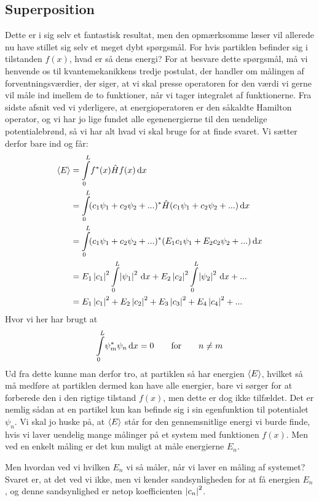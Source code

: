 \documentclass[../Kvantemekanik.tex]{subfiles}
\begin{document}
\subsection{Superposition}
Dette er i sig selv et fantastisk resultat, men den opmærksomme læser vil allerede nu have stillet sig selv et meget dybt spørgsmål. For hvis partiklen befinder sig i tilstanden $f(x)$, hvad er så dens energi? For at besvare dette spørgsmål, må vi henvende os til kvantemekanikkens tredje postulat, der handler om målingen af forventningsværdier, der siger, at vi skal presse operatoren for den værdi vi gerne vil måle ind imellem de to funktioner, når vi tager integralet af funktionerne. Fra sidste afsnit ved vi yderligere, at energioperatoren er den såkaldte Hamilton operator, og vi har jo lige fundet alle egenenergierne til den uendelige potentialebrønd, så vi har alt hvad vi skal bruge for at finde svaret. Vi sætter derfor bare ind og får:
\begin{align}
    \expect E&=\integral{f^*(x)\op H f(x)}{x}{0}{L}\nonumber\\
    &=\integral{(c_1\psi_1+c_2\psi_2+...)^{*}\hat{H}(c_1\psi_1+c_2\psi_2+...)}{x}{0}{L}\nonumber\\
    &=\integral{(c_1\psi_1+c_2\psi_2+...)^{*}(E_1c_1\psi_1+E_2c_2\psi_2+...)}{x}{0}{L}\nonumber\\
    &=E_1\abs{c_1}^2\integral{\abs{\psi_1}^2}{x}{0}{L}+E_2\abs{c_2}^2\integral{\abs{\psi_2}^2}{x}{0}{L}+...\nonumber\\
    &=E_1\abs{c_1}^2+E_2\abs{c_2}^2+E_3\abs{c_3}^2+E_4\abs{c_4}^2+...\label{eq:kvant:frovE}
\end{align}
Hvor vi her har brugt at 
$$ \integral{\psi_{m}^{*}\psi_n}{x}{0}{L}=0 \qquad \text{for} \qquad n \neq m$$
Ud fra dette kunne man derfor tro, at partiklen så har energien $\expect E$, hvilket så må medføre at partiklen dermed kan have alle energier, bare vi sørger for at forberede den i den rigtige tilstand $f(x)$, men dette er dog ikke tilfældet.
Det er nemlig sådan at en partikel kun kan befinde sig i sin egenfunktion til potentialet $\psi_n$. Vi skal jo huske på, at $\expect E$ står for den gennemsnitlige energi vi burde finde, hvis vi laver uendelig mange målinger på et system med funktionen $f(x)$. Men ved en enkelt måling er det kun muligt at måle energierne $E_n$.

Men hvordan ved vi hvilken $E_n$ vi så måler, når vi laver en måling af systemet? Svaret er, at det ved vi ikke, men vi kender sandsynligheden for at få energien $E_n$, og denne sandsynlighed er netop koefficienten $\abs{c_n}^2$. 
\end{document}
